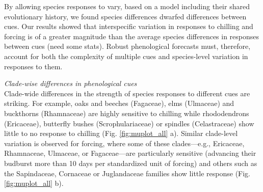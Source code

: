 \documentclass{article}\usepackage[]{graphicx}\usepackage[]{color}
\begin{document}
By allowing species responses to vary, based on a model including their shared evolutionary history, we found species differences dwarfed differences between cues. Our results showed that interspecific variation in responses to chilling and forcing is of a greater magnitude than the average species differences in responses between cues (need some stats). Robust phenological forecasts must, therefore, account for both the complexity of multiple cues and species-level variation in responses to them.


\emph{Clade-wise differences in phenological cues}\\

Clade-wide differences in the strength of species responses to different cues are striking. For example, oaks and beeches (Fagaceae), elms (Ulmaceae) and buckthorns (Rhamnaceae) are highly sensitive to chilling while rhododendrons (Ericaceae), butterfly bushes (Scrophulariaceae) or spindles (Celastraceae) show little to no response to chilling (Fig. \ref{fig:muplot_all} a). %
Similar clade-level variation is observed for forcing, where some of these clades---e.g., Ericaceae, Rhamnaceae, Ulmaceae, or Fagaceae---are particularly sensitive (advancing their budburst more than 10 days per standardized unit of forcing) and others such as the Sapindaceae, Cornaceae or Juglandaceae families show little response (Fig. \ref{fig:muplot_all} b).\\ %
\end{document}

